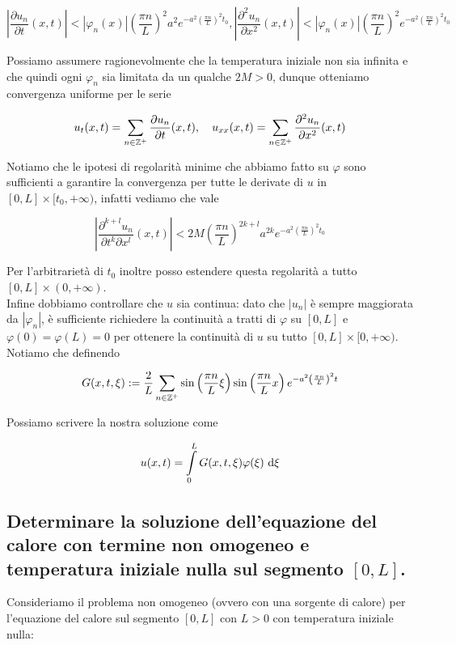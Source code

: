 \documentclass{article}
\begin{document}
\[ \left| \frac{\partial u_n}{\partial t}(x,t) \right| < |\varphi_n(x)| \left(\frac{\pi n}{L}\right)^{2} a^{2} e^{- a^2 \left( \frac{\pi n}{L}\right)^2 t_0 }, \left| \frac{\partial^{2}u_n}{ \partial x^2}(x,t) \right| < |\varphi_n(x)| \left(\frac{\pi n}{L}\right)^{2} e^{- a^2 \left( \frac{\pi n}{L}\right)^2 t_0 } \]

Possiamo assumere ragionevolmente che la temperatura iniziale non sia infinita e che quindi ogni $\varphi_n$ sia limitata da un qualche $2M > 0$, dunque otteniamo convergenza uniforme per le serie 

\[ u_t(x,t) = \sum_{n\in \mathbb{Z}^+} \frac{\partial u_n}{\partial t}(x,t), \quad u_{xx}(x,t) = \sum_{n\in \mathbb{Z}^+} \frac{\partial^2 u_n}{\partial x^2}(x,t) \]

Notiamo che le ipotesi di regolarità minime che abbiamo fatto su $\varphi$ sono sufficienti a garantire la convergenza per tutte le derivate di $u$ in $[0,L]\times [t_0, +\infty)$, infatti vediamo che vale

\[ \left| \frac{\partial^{k+l}u_n}{\partial t^k \partial x^l}(x,t) \right| < 2M \left(\frac{\pi n}{L}\right)^{2k+l} a^{2k} e^{- a^2 \left( \frac{\pi n}{L}\right)^2 t_0 } \]

Per l'arbitrarietà di $t_0$ inoltre posso estendere questa regolarità a tutto $[0,L]\times (0,+\infty)$.\\
Infine dobbiamo controllare che $u$ sia continua: dato che $|u_n|$ è sempre maggiorata da $|\varphi_n|$, è sufficiente richiedere la continuità a tratti di $\varphi$ su $[0,L]$ e $\varphi(0)=\varphi(L) = 0$ per ottenere la continuità di $u$ su tutto $[0,L]\times [0,+\infty)$. Notiamo che definendo

\[ G(x,t,\xi) := \frac{2}{L}\sum_{n \in \mathbb{Z}^+} \sin\left( \frac{\pi n}{L}\xi \right)\sin\left( \frac{\pi n}{L}x \right) e^{-a^2 \left( \frac{\pi n}{L} \right)^2 t}\] 

Possiamo scrivere la nostra soluzione come 

\[ u(x,t)=  \intop_0^L  G(x,t,\xi)\varphi(\xi) \de\xi \]

\subsection{Determinare la soluzione dell'equazione del calore con termine non omogeneo e temperatura iniziale nulla sul segmento $[0,L]$.}

Consideriamo il problema non omogeneo (ovvero con una sorgente di calore) per l'equazione del calore sul segmento $[0,L]$ con $L>0$ con temperatura iniziale nulla:
\end{document}
